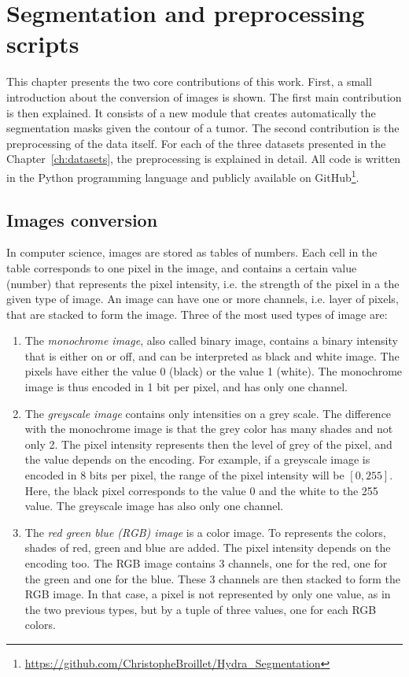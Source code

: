 
\chapter{Segmentation and preprocessing scripts}
\label{ch:preprocscripts}
This chapter presents the two core contributions of this work. First, a small introduction about the conversion of images is shown. The first main contribution is then explained. It consists of a new module that creates automatically the segmentation masks given the contour of a tumor. The second contribution is the preprocessing of the data itself. For each of the three datasets presented in the Chapter~\ref{ch:datasets}, the preprocessing is explained in detail. All code is written in the Python programming language and publicly available on GitHub\footnote{\url{https://github.com/ChristopheBroillet/Hydra_Segmentation}}.

\section{Images conversion}
\label{sec:imgconversion}
In computer science, images are stored as tables of numbers. Each cell in the table corresponds to one pixel in the image, and contains a certain value (number) that represents the pixel intensity, i.e. the strength of the pixel in a the given type of image. An image can have one or more channels, i.e. layer of pixels, that are stacked to form the image. Three of the most used types of image are:
\begin{enumerate}
  \item The \emph{monochrome image}, also called binary image, contains a binary intensity that is either on or off, and can be interpreted as black and white image. The pixels have either the value 0 (black) or the value 1 (white). The monochrome image is thus encoded in 1 bit per pixel, and has only one channel.
  \item The \emph{greyscale image} contains only intensities on a grey scale. The difference with the monochrome image is that the grey color has many shades and not only 2. The pixel intensity represents then the level of grey of the pixel, and the value depends on the encoding. For example, if a greyscale image is encoded in 8 bits per pixel, the range of the pixel intensity will be $[0,255]$. Here, the black pixel corresponds to the value 0 and the white to the 255 value. The greyscale image has also only one channel.
  \item The \emph{red green blue (RGB) image} is a color image. To represents the colors, shades of red, green and blue are added. The pixel intensity depends on the encoding too. The RGB image contains 3 channels, one for the red, one for the green and one for the blue. These 3 channels are then stacked to form the RGB image. In that case, a pixel is not represented by only one value, as in the two previous types, but by a tuple of three values, one for each RGB colors.
\end{enumerate}

